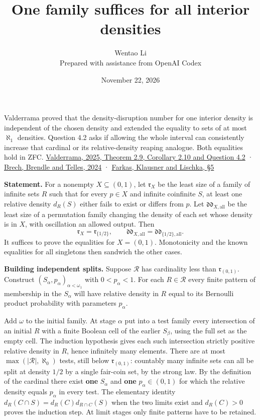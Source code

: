 \documentclass[11pt]{article}
\author{Wentao Li\\\small Prepared with assistance from OpenAI Codex}
\date{November 22, 2026}
\title{One family suffices for all interior densities}
\begin{document}
\maketitle
Valderrama proved that the density-disruption number for one interior density is independent of the chosen density and extended the equality to sets of at most \(\aleph_1\) densities. Question 4.2 asks if allowing the whole interval can consistently increase that cardinal or its relative-density reaping analogue. Both equalities hold in ZFC. \href{https://arxiv.org/abs/2506.21059}{Valderrama, 2025, Theorem 2.9, Corollary 2.10 and Question 4.2} · \href{https://arxiv.org/abs/2410.21102}{Brech, Brendle and Telles, 2024} · \href{https://doi.org/10.1017/jsl.2023.62}{Farkas, Klausner and Lischka, §5}

\textbf{Statement.} For a nonempty \(X\subseteq(0,1)\), let \(\mathfrak r_X\) be the least size of a family of infinite sets \(R\) such that for every \(p\in X\) and infinite coinfinite \(S\), at least one relative density \(d_R(S)\) either fails to exist or differs from \(p\). Let \(\mathfrak{dd}_{X,\mathrm{all}}\) be the least size of a permutation family changing the density of each set whose density is in \(X\), with oscillation an allowed output. Then \[
 \mathfrak r_X=\mathfrak r_{\{1/2\}},\qquad
 \mathfrak{dd}_{X,\mathrm{all}}=\mathfrak{dd}_{\{1/2\},\mathrm{all}} .
\] It suffices to prove the equalities for \(X=(0,1)\). Monotonicity and the known equalities for all singletons then sandwich the other cases.

\textbf{Building independent splits.} Suppose \(\mathcal R\) has cardinality less than \(\mathfrak r_{(0,1)}\). Construct \((S_\alpha,p_\alpha)_{\alpha<\omega_1}\) with \(0<p_\alpha<1\). For each \(R\in\mathcal R\) every finite pattern of membership in the \(S_\alpha\) will have relative density in \(R\) equal to its Bernoulli product probability with parameters \(p_\alpha\).

Add \(\omega\) to the initial family. At stage \(\alpha\) put into a test family every intersection of an initial \(R\) with a finite Boolean cell of the earlier \(S_\beta\), using the full set as the empty cell. The induction hypothesis gives each such intersection strictly positive relative density in \(R\), hence infinitely many elements. There are at most \(\max(|\mathcal R|,\aleph_0)\) tests, still below \(\mathfrak r_{(0,1)}\): countably many infinite sets can all be split at density \(1/2\) by a single fair-coin set, by the strong law. By the definition of the cardinal there exist \textbf{one} \(S_\alpha\) and \textbf{one} \(p_\alpha\in(0,1)\) for which the relative density equals \(p_\alpha\) in every test. The elementary identity \(d_R(C\cap S)=d_R(C)d_{R\cap C}(S)\) when the two limits exist and \(d_R(C)>0\) proves the induction step. At limit stages only finite patterns have to be retained.
\end{document}
